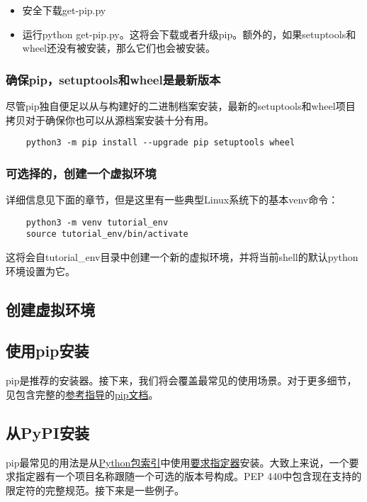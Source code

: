 \documentclass[../package_tutorial.tex]{subfiles}
\begin{document}
\begin{itemize}
    \item 安全下载get-pip.py
    \item 运行python get-pip.py。这将会下载或者升级pip。额外的，如果setuptools和wheel还没有被安装，那么它们也会被安装。
\end{itemize}

\subsubsection{确保pip，setuptools和wheel是最新版本}

尽管pip独自便足以从与构建好的二进制档案安装，最新的setuptools和wheel项目拷贝对于确保你也可以从源档案安装十分有用。

\begin{lstlisting}
    python3 -m pip install --upgrade pip setuptools wheel
\end{lstlisting}

\subsubsection{可选择的，创建一个虚拟环境}

详细信息见下面的章节，但是这里有一些典型Linux系统下的基本venv命令：

\begin{lstlisting}
    python3 -m venv tutorial_env
    source tutorial_env/bin/activate
\end{lstlisting}

这将会自tutorial\_env目录中创建一个新的虚拟环境，并将当前shell的默认python环境设置为它。

\subsection{创建虚拟环境}
\subsection{使用pip安装}

pip是推荐的安装器。接下来，我们将会覆盖最常见的使用场景。对于更多细节，见包含完整的\href{https://pip.pypa.io/en/latest/cli/}{参考指导}的\href{https://pip.pypa.io/en/latest/cli/}{pip文档}。

\subsection{从PyPI安装}

pip最常见的用法是从\href{https://packaging.python.org/glossary/#term-Python-Package-Index-PyPI}{Python包索引}中使用\href{https://packaging.python.org/glossary/#term-Requirement-Specifier}{要求指定器}安装。大致上来说，一个要求指定器有一个项目名称跟随一个可选的版本号构成。PEP 440中包含现在支持的限定符的完整规范。接下来是一些例子。
\end{document}
